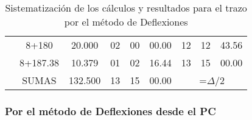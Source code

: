\begin{table}[h!]
\begin{tabular}{@{}ccccccccc@{}}
                          & 8+180                 & 20.000                                                                       & 02      & 00       & 00.00          & 12      & 12       & 43.56          \\
                          & 8+187.38              & 10.379                                                                       & 01      & 02       & 16.44          & 13      & 15       & 00.00          \\
                          & SUMAS                 & 132.500                                                                      & 13      & 15       & 00.00          & \multicolumn{3}{c}{=$\Delta/2$}     \\ \bottomrule
    \end{tabular}
    \caption{Sistematización de los cálculos y resultados para el trazo por el método de Deflexiones}
    \label{tabta23}
\end{table}

\subsubsection{Por el método de Deflexiones desde el PC}

